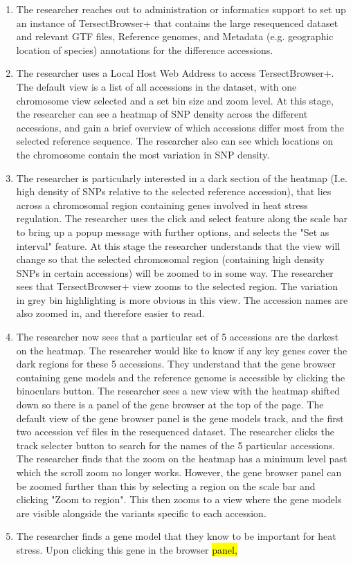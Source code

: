 \documentclass[12pt]{article}
\begin{document}
\begin{enumerate}
  \item The researcher reaches out to administration or informatics support to set up an instance of TersectBrowser+ that contains the large resequenced dataset and relevant GTF files, Reference genomes, and Metadata (e.g. geographic location of species) annotations for the difference accessions. 
  \item The researcher uses a Local Host Web Address to access TersectBrowser+. The default view is a list of all accessions in the dataset, with one chromosome view selected and a set bin size and zoom level. 
  \subitem  At this stage, the researcher can see a heatmap of SNP density across the different accessions, and gain a brief overview of which accessions differ most from the selected reference sequence. The researcher also can see which locations on the chromosome contain the most variation in SNP density. 
  \item The researcher is particularly interested in a dark section of the heatmap (I.e. high density of SNPs relative to the selected reference accession), that lies across a chromosomal region containing genes involved in heat stress regulation. The researcher uses the click and select feature along the scale bar to bring up a popup message with further options, and selects the "Set as interval" feature. 
  \subitem At this stage the researcher understands that the view will change so that the selected chromosomal region (containing high density SNPs in certain accessions) will be zoomed to in some way.  
  \subitem The researcher sees that TersectBrowser+ view zooms to the selected region. The variation in grey bin highlighting is more obvious in this view. The accession names are also zoomed in, and therefore easier to read.
  \item The researcher now sees that a particular set of 5 accessions are the darkest on the heatmap. The researcher would like to know if any key genes cover the dark regions for these 5 accessions. They understand that the gene browser containing gene models and the reference genome is accessible by clicking the binoculars button.  
  \subitem The researcher sees a new view with the heatmap shifted down so there is a panel of the gene browser at the top of the page. The default view of the gene browser panel is the gene models track, and the first two accession vcf files in the resequenced dataset. The researcher clicks the track selecter button to search for the names of the 5 particular accessions. 
  \subitem The researcher finds that the zoom on the heatmap has a minimum level past which the scroll zoom no longer works. However, the gene browser panel can be zoomed further than this by selecting a region on the scale bar and clicking "Zoom to region". 
  \subitem This then zooms to a view where the gene models are visible alongside the variants specific to each accession.  
  \item The researcher finds a gene model that they know to be important for heat stress. Upon clicking this gene in the browser \hl{panel,}
\end{enumerate}
\end{document}
